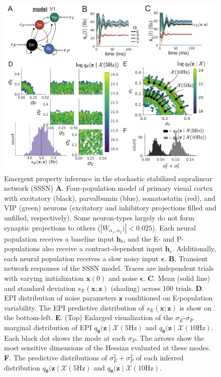 \documentclass[11pt]{article}
\begin{document}
\begin{figure}
\vspace{-1cm}
\begin{center}
\includegraphics[scale=0.8]{figures/fig3/fig3.pdf}
\end{center}
\caption{Emergent property inference in the stochastic stabilized supralinear network (SSSN)
\textbf{A}.  Four-population model of primary visual cortex with excitatory (black), parvalbumin (blue), somatostatin (red), and VIP (green) neurons (excitatory and inhibitory projections filled and unfilled, respectively).   
Some neuron-types largely do not form synaptic projections to others ($|W_{\alpha_1, \alpha_2})| < 0.025$).
Each neural population receives a baseline input $\mathbf{h}_b$, and the E- and P-populations also receive a contrast-dependent input $\mathbf{h}_c$.
Additionally, each neural population receives a slow noisy input $\bm{\epsilon}$.
\textbf{B}. Transient network responses of the SSSN model. Traces are independent trials with varying initialization $\mathbf{x}(0)$ and noise $\bm{\epsilon}$. 
\textbf{C}. Mean (solid line) and standard deviation $s_E(\mathbf{x}; \mathbf{z})$ (shading)  across 100 trials.
\textbf{D}. EPI distribution of noise parameters $\mathbf{z}$ conditioned on E-population variability.
The EPI predictive distribution of $s_E(\mathbf{x}; \mathbf{z})$ is show on the bottom-left.
\textbf{E}. (Top) Enlarged visualization of the $\sigma_E$-$\sigma_P$ marginal distribution of EPI $q_{\bm{\theta}}(\mathbf{z} \mid \mathcal{X}(5\text{Hz})$ and $q_{\bm{\theta}}(\mathbf{z} \mid \mathcal{X}(10\text{Hz})$.
Each black dot shows the mode at each $\sigma_P$.
The arrows show the most sensitive dimensions of the Hessian evaluated at these modes.
\textbf{F}. The predictive distributions of $\sigma_E^2 + \sigma_P^2$ of each inferred distribution $q_{\bm{\theta}}(\mathbf{z} \mid \mathcal{X}(5\text{Hz})$ and $q_{\bm{\theta}}(\mathbf{z} \mid \mathcal{X}(10\text{Hz})$.
}
 \label{fig:V1}
\end{figure}
\end{document}
